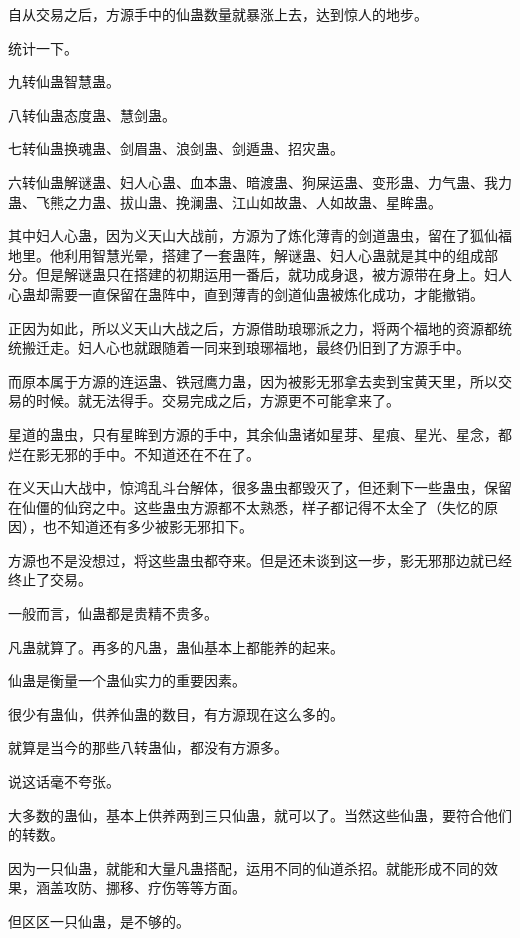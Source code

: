 \begin{this_body}
自从交易之后，方源手中的仙蛊数量就暴涨上去，达到惊人的地步。

统计一下。

九转仙蛊智慧蛊。

八转仙蛊态度蛊、慧剑蛊。

七转仙蛊换魂蛊、剑眉蛊、浪剑蛊、剑遁蛊、招灾蛊。

六转仙蛊解谜蛊、妇人心蛊、血本蛊、暗渡蛊、狗屎运蛊、变形蛊、力气蛊、我力蛊、飞熊之力蛊、拔山蛊、挽澜蛊、江山如故蛊、人如故蛊、星眸蛊。

其中妇人心蛊，因为义天山大战前，方源为了炼化薄青的剑道蛊虫，留在了狐仙福地里。他利用智慧光晕，搭建了一套蛊阵，解谜蛊、妇人心蛊就是其中的组成部分。但是解谜蛊只在搭建的初期运用一番后，就功成身退，被方源带在身上。妇人心蛊却需要一直保留在蛊阵中，直到薄青的剑道仙蛊被炼化成功，才能撤销。

正因为如此，所以义天山大战之后，方源借助琅琊派之力，将两个福地的资源都统统搬迁走。妇人心也就跟随着一同来到琅琊福地，最终仍旧到了方源手中。

而原本属于方源的连运蛊、铁冠鹰力蛊，因为被影无邪拿去卖到宝黄天里，所以交易的时候。就无法得手。交易完成之后，方源更不可能拿来了。

星道的蛊虫，只有星眸到方源的手中，其余仙蛊诸如星芽、星痕、星光、星念，都烂在影无邪的手中。不知道还在不在了。

在义天山大战中，惊鸿乱斗台解体，很多蛊虫都毁灭了，但还剩下一些蛊虫，保留在仙僵的仙窍之中。这些蛊虫方源都不太熟悉，样子都记得不太全了（失忆的原因），也不知道还有多少被影无邪扣下。

方源也不是没想过，将这些蛊虫都夺来。但是还未谈到这一步，影无邪那边就已经终止了交易。

一般而言，仙蛊都是贵精不贵多。

凡蛊就算了。再多的凡蛊，蛊仙基本上都能养的起来。

仙蛊是衡量一个蛊仙实力的重要因素。

很少有蛊仙，供养仙蛊的数目，有方源现在这么多的。

就算是当今的那些八转蛊仙，都没有方源多。

说这话毫不夸张。

大多数的蛊仙，基本上供养两到三只仙蛊，就可以了。当然这些仙蛊，要符合他们的转数。

因为一只仙蛊，就能和大量凡蛊搭配，运用不同的仙道杀招。就能形成不同的效果，涵盖攻防、挪移、疗伤等等方面。

但区区一只仙蛊，是不够的。


\end{this_body}
